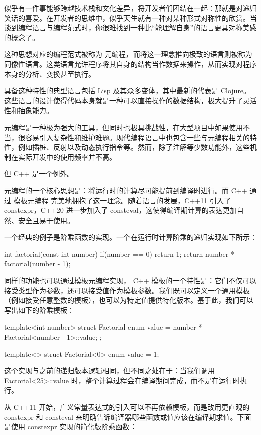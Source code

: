 
似乎有一件事能够跨越技术栈和文化差异，将开发者们团结在一起：那就是对递归笑话的喜爱。在开发者的思维中，似乎天生就有一种对某种形式对称性的欣赏。当谈到编程语言与编程范式时，你很难找到一种比“能理解自身”的语言更具对称美感的概念了。

这种思想对应的编程范式被称为 元编程，而将这一理念推向极致的语言则被称为 同像性语言。这类语言允许程序将其自身的结构当作数据来操作，从而实现对程序本身的分析、变换甚至执行。

具备这种特性的典型语言包括 Lisp 及其众多变体，其中最新的代表是 Clojure。这些语言的设计使得代码本身就是一种可以直接操作的数据结构，极大提升了灵活性和抽象能力。

元编程是一种极为强大的工具，但同时也极具挑战性，在大型项目中如果使用不当，很容易引入复杂性和维护难题。现代编程语言中也包含一些与元编程相关的特性，例如插桩、反射以及动态执行指令等。然而，除了注解等少数功能外，这些机制在实际开发中的使用频率并不高。

但 C++ 是一个例外。

元编程的一个核心思想是：将运行时的计算尽可能提前到编译时进行。而 C++ 通过 模板元编程 完美地拥抱了这一理念。随着语言的发展，C++11 引入了 constexpr，C++20 进一步加入了 consteval，这使得编译期计算的表达更加自然、安全且易于使用。

一个经典的例子是阶乘函数的实现。一个在运行时计算阶乘的递归实现如下所示：

\begin{cpp}
int factorial(const int number){
  if(number == 0) return 1;
  return number * factorial(number - 1);
}
\end{cpp}

同样的功能也可以通过模板元编程实现， C++ 模板的一个特性是：它们不仅可以接受类型作为参数，还可以接受值作为模板参数。我们既可以定义一个通用模板（例如接受任意整数的模板），也可以为特定值提供特化版本。基于此，我们可以写出如下的阶乘模板：

\begin{cpp}
template<int number>
struct Factorial {
  enum { value = number * Factorial<number - 1>::value};
};

template<>
struct Factorial<0>{
  enum {value = 1};
}
\end{cpp}

这个实现与之前的递归版本逻辑相同，但不同之处在于：当我们调用 Factorial<25>::value 时，整个计算过程会在编译期间完成，而不是在运行时执行。

从 C++11 开始，广义常量表达式的引入可以不再依赖模板，而是改用更直观的 constexpr 和 consteval 来明确告诉编译器哪些函数或值应该在编译期求值。下面是使用 constexpr 实现的简化版阶乘函数：

